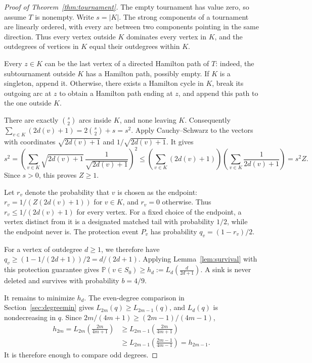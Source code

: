 \documentclass[12pt]{article}
\newcommand{\Pp}{\mathbb P}
\newcommand{\abs}[1]{|#1|}
\begin{document}
\begin{proof}[Proof of Theorem~\ref{thm:tournament}]
The empty tournament has value zero, so assume \(T\) is nonempty. Write \(s=\abs K\). The strong components of a tournament are linearly ordered, with every arc between two components pointing in the same direction. Thus every vertex outside \(K\) dominates every vertex in \(K\), and the outdegrees of vertices in \(K\) equal their outdegrees within \(K\).

Every \(z\in K\) can be the last vertex of a directed Hamilton path of \(T\): indeed, the subtournament outside \(K\) has a Hamilton path, possibly empty. If \(K\) is a singleton, append it. Otherwise, there exists a Hamilton cycle in \(K\), break its outgoing arc at \(z\) to obtain a Hamilton path ending at \(z\), and append this path to the one outside \(K\).

There are exactly \(\binom{s}{2}\) arcs inside \(K\), and none leaving \(K\). Consequently \(\sum_{v\in K}(2d(v)+1)=2\binom{s}{2}+s=s^2\). Apply Cauchy--Schwarz to the vectors with coordinates \(\sqrt{2d(v)+1}\) and \(1/\sqrt{2d(v)+1}\). It gives
\[
s^2=\left(\sum_{v\in K}\sqrt{2d(v)+1}\,
\frac1{\sqrt{2d(v)+1}}\right)^2
\le\left(\sum_{v\in K}(2d(v)+1)\right)
\left(\sum_{v\in K}\frac1{2d(v)+1}\right)
=s^2Z.
\]
Since \(s>0\), this proves \(Z\ge1\).

Let \(r_v\) denote the probability that \(v\) is chosen as the endpoint: \(r_v=1/(Z(2d(v)+1))\) for \(v\in K\), and \(r_v=0\) otherwise. Thus \(r_v\le1/(2d(v)+1)\) for every vertex. For a fixed choice of the endpoint, a vertex distinct from it is a designated matched tail with probability \(1/2\), while the endpoint never is. The protection event \(P_v\) has probability \(q_v=(1-r_v)/2\).

For a vertex of outdegree \(d\ge1\), we therefore have
\(q_v\ge(1-1/(2d+1))/2=d/(2d+1)\).
Applying Lemma~\ref{lem:survival} with this protection guarantee gives \(\Pp(v\in S_0)\ge h_d:= L_d\left(\frac{d}{2d+1}\right) \). A sink is never deleted and survives with probability \(b=4/9\).

It remains to minimize \(h_d\). The even-degree comparison in Section~\ref{sec:degreemin} gives \(L_{2m}(q)\ge L_{2m-1}(q)\), and \(L_d(q)\) is nondecreasing in \(q\). Since \(2m/(4m+1)\ge(2m-1)/(4m-1)\),
\[
\begin{aligned}
h_{2m}=L_{2m}\left(\frac{2m}{4m+1}\right)
&\ge L_{2m-1}\left(\frac{2m}{4m+1}\right)\\
&\ge L_{2m-1}\left(\frac{2m-1}{4m-1}\right)=h_{2m-1}.
\end{aligned}
\]
It is therefore enough to compare odd degrees.


\end{proof}
\end{document}
